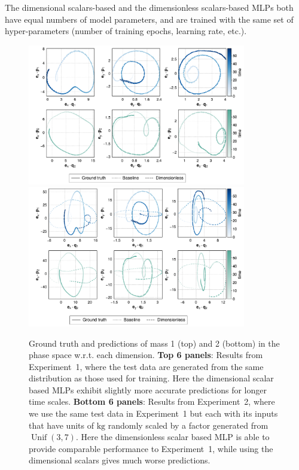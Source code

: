 \documentclass[twoside,11pt]{article}
\DeclareMathOperator{\Unif}{Unif}
\newcommand{\unit}[1]{\mathrm{#1}}
\newcommand{\kg}{\unit{kg}}
\begin{document}
The dimensional scalars-based and the dimensionless scalars-based MLPs both have equal numbers of model parameters, and are trained with the same set of hyper-parameters (number of training epochs, learning rate, etc.).

\begin{figure}[tp]
    \centering
    \includegraphics[width=0.85\textwidth]{imgs/phase_test_jobID1_1.pdf}\\[3ex]
    \includegraphics[width=0.85\textwidth]{imgs/phase_test1_jobID1_1.pdf} 
    \caption{Ground truth and predictions of mass 1 (top) and 2 (bottom) in the phase space w.r.t. each dimension. \textbf{Top 6 panels}: Results from Experiment~1, where the test data are generated from the same distribution as those used for training. Here the dimensional scalar based MLPs exhibit slightly more accurate predictions for longer time scales. \textbf{Bottom 6 panels}: Results from Experiment~2, where we use the same test data in Experiment~1 but each with its inputs that have units of $\kg$ randomly scaled by a factor generated from $\Unif(3,7)$. Here the dimensionless scalar based MLP is able to provide comparable performance to Experiment~1, while using the dimensional scalars gives much worse predictions.}
    \label{fig:double_pendulum}
\end{figure}
\end{document}
